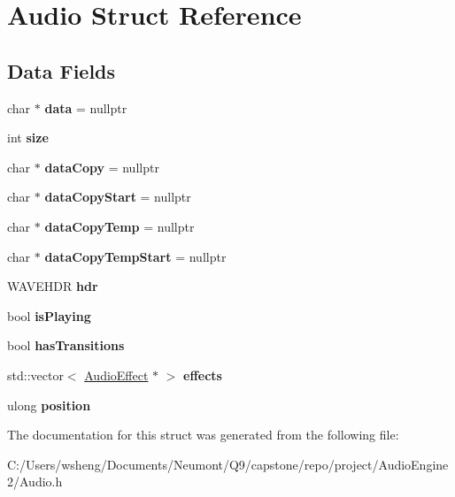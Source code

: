 \hypertarget{struct_audio}{}\section{Audio Struct Reference}
\label{struct_audio}
\subsection*{Data Fields}
\begin{DoxyCompactItemize}
\item 
\mbox{\label{struct_audio_a91a70b77df95bd8b0830b49a094c2acb}} 
char $\ast$ {\bfseries data} = nullptr
\item 
\mbox{\label{struct_audio_a439227feff9d7f55384e8780cfc2eb82}} 
int {\bfseries size}
\item 
\mbox{\label{struct_audio_abf055b7bb4eb634ebbe87e313d03ed5d}} 
char $\ast$ {\bfseries data\+Copy} = nullptr
\item 
\mbox{\label{struct_audio_ad05a53994d877780ac57adcdae19d14a}} 
char $\ast$ {\bfseries data\+Copy\+Start} = nullptr
\item 
\mbox{\label{struct_audio_a9c2fa101c72ac724349e7bebb1095069}} 
char $\ast$ {\bfseries data\+Copy\+Temp} = nullptr
\item 
\mbox{\label{struct_audio_ab4ce7d10d35e4cec811c180b84d55b1f}} 
char $\ast$ {\bfseries data\+Copy\+Temp\+Start} = nullptr
\item 
\mbox{\label{struct_audio_ac3edb321f6ee77182631604a2cbf3e5a}} 
W\+A\+V\+E\+H\+DR {\bfseries hdr}
\item 
\mbox{\label{struct_audio_af55f7beec49af3268e5ed9aa85dc8d4f}} 
bool {\bfseries is\+Playing}
\item 
\mbox{\label{struct_audio_a7d90efa30ca531e595377bb69f40148b}} 
bool {\bfseries has\+Transitions}
\item 
\mbox{\label{struct_audio_a6331d4f1345946e4f6471df9ffb2d3d8}} 
std\+::vector$<$ \hyperlink{struct_audio_effect}{Audio\+Effect} $\ast$ $>$ {\bfseries effects}
\item 
\mbox{\label{struct_audio_af9d9942b757de1809a24be58b93be0f7}} 
ulong {\bfseries position}
\end{DoxyCompactItemize}


The documentation for this struct was generated from the following file\+:\begin{DoxyCompactItemize}
\item 
C\+:/\+Users/wsheng/\+Documents/\+Neumont/\+Q9/capstone/repo/project/\+Audio\+Engine2/Audio.\+h\end{DoxyCompactItemize}
